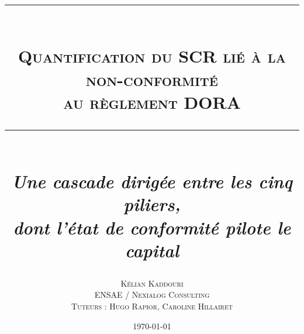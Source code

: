 \captionsetup{font=small,labelfont=sc,labelsep=period,skip=6pt}
\captionsetup[sub]{font=small,labelfont=rm,labelformat=parens,labelsep=space,skip=3pt}

\pagestyle{fancy}
\fancyhf{}
\fancyhead[L]{\small\scshape\nouppercase{\leftmark}}
\fancyhead[R]{\small\thepage}
\fancyfoot[L]{\small\scshape\nouppercase{\leftmark}}
\fancyfoot[R]{\small\thepage}
\renewcommand{\headrulewidth}{0.4pt}
\renewcommand{\footrulewidth}{0.4pt}
\fancypagestyle{plain}{%
  \fancyhf{}%
  \fancyfoot[L]{\small\scshape\nouppercase{\leftmark}}%
  \fancyfoot[R]{\small\thepage}%
  \renewcommand{\headrulewidth}{0pt}%
  \renewcommand{\footrulewidth}{0.4pt}}

\title{%
  \vspace{-0.8cm}
  \rule{\textwidth}{1pt}\\[10pt]
  {\Large\scshape Quantification du SCR lié à la non-conformité\\[4pt]
   au règlement DORA}\\[10pt]
  \rule{\textwidth}{0.4pt}\\[12pt]
  {\large\itshape Une cascade dirigée entre les cinq piliers,\\
   dont l'état de conformité pilote le capital}}
\author{\normalsize\scshape Kélian Kaddouri \\[6pt]
  \normalfont\small ENSAE / Nexialog Consulting \\
  \small Tuteurs : Hugo Rapior, Caroline Hillairet}
\date{\small\today}
